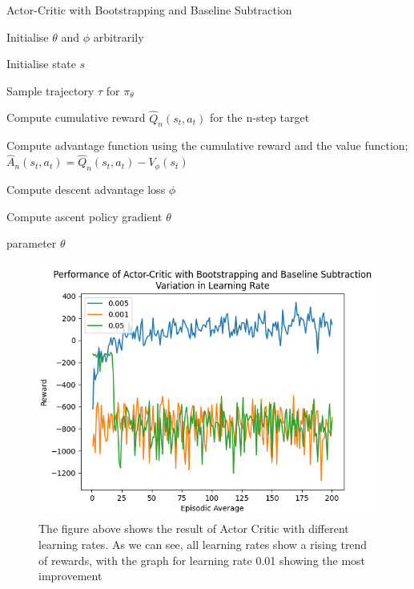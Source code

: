 \documentclass{article}
\begin{document}
\begin{algorithm}[htbp]
\caption{Actor-Critic with Bootstrapping and Baseline Subtraction}
\SetAlgoLined
\DontPrintSemicolon
\small %
Initialise $\theta$ and $\phi$ arbitrarily\;\\
{
    Initialise state $s$\;
     \item Sample trajectory $\tau$ for $\pi_\theta$
     \item
    {
     \item Compute cumulative reward $\hat{Q}_n(s_t,a_t)$  for the n-step target
     \item Compute advantage function using the cumulative reward and the value function;
     \(\hat{A}_n(s_t,a_t) = \hat{Q}_n(s_t,a_t) - V_\phi(s_t)\)
    }
    \item Compute descent advantage loss $\phi$
    \item Compute ascent policy gradient $\theta$
}
\State \Return parameter $\theta$
\end{algorithm}
\begin{figure}[htbp]
\centering
\includegraphics[width=0.9\linewidth]{Report/images/Performance_of_Actor_Critic_BSandBS_LR.png}
\caption{\label{fig:ActorCriticBS2-different learning rates}The figure above shows the result of Actor Critic with different learning rates. As we can see, all learning rates show a rising trend of rewards, with the graph for learning rate 0.01 showing the most improvement}
\end{figure}
\end{document}
